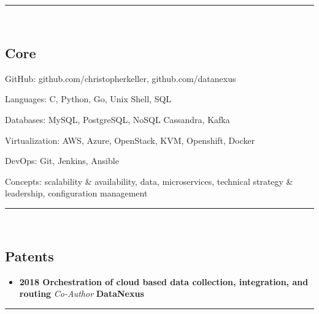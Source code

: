 

\hrule\
\vspace{-0.4em}
\subsection*{Core}
\begin{indentsection}{\parindent}
    \begin{description*}
        \item[GitHub:] github.com/christopherkeller, github.com/datanexus
        \item[Languages:] C, Python, Go, Unix Shell, \textsc{SQL}
        \item[Databases:] My\textsc{SQL}, Postgre\textsc{SQL}, NoSQL Cassandra, Kafka
        \item[Virtualization:] AWS, Azure, OpenStack, KVM, Openshift, Docker
        \item[DevOps:] Git, Jenkins, Ansible
        \item[Concepts:] scalability \& availability, data, microservices, technical strategy \& leadership, configuration management
	\end{description*}
\end{indentsection}
\hrule\
\vspace{-0.4em}

\subsection*{Patents}

\begin{itemize}
    \parskip=0.1em
    \item
    \headerrow
        {\textbf{2018 Orchestration of cloud based data collection, integration, and routing} {\emph{Co-Author}}}
        {\textbf{DataNexus}}
  
\end{itemize}

\hrule\
\vspace{-0.4em}

